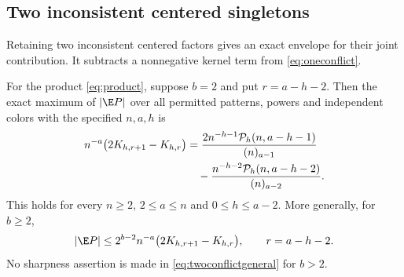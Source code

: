 \subsection{Two inconsistent centered singletons}

Retaining two inconsistent centered factors gives an exact envelope for their joint contribution. It subtracts a nonnegative kernel term from \eqref{eq:oneconflict}.

\begin{theorem}\label{thm:twoconflict}
For the product \eqref{eq:product}, suppose $b=2$ and put $r=a-h-2$. Then the exact maximum of $|\E P|$ over all permitted patterns, powers and independent colors with the specified $n,a,h$ is
\begin{align}
n^{-a}\bigl(2K_{h,r+1}-K_{h,r}\bigr)
&=\frac{2n^{-h-1}\mathcal P_h(n,a-h-1)}{(n)_{a-1}}\notag\\
&\quad-\frac{n^{-h-2}\mathcal P_h(n,a-h-2)}{(n)_{a-2}}.
\label{eq:twoconflictexact}
\end{align}
This holds for every $n\ge2$, $2\le a\le n$ and $0\le h\le a-2$. More generally, for $b\ge2$,
\begin{equation}\label{eq:twoconflictgeneral}
|\E P|\le2^{b-2}n^{-a}\bigl(2K_{h,r+1}-K_{h,r}\bigr),
\qquad r=a-h-2.
\end{equation}
No sharpness assertion is made in \eqref{eq:twoconflictgeneral} for $b>2$.
\end{theorem}

